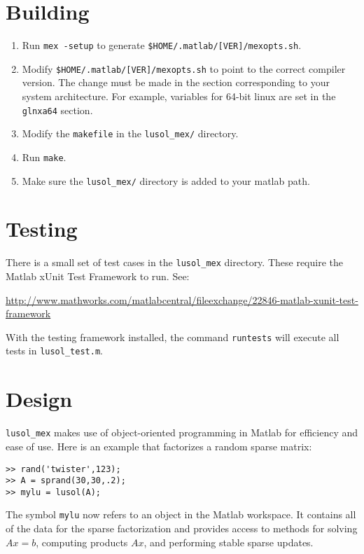 \documentclass[11pt]{article}
\newcommand{\lmex}{\texttt{lusol\_mex}\xspace}
\begin{document}
\section{Building}

\begin{enumerate}
\item Run \texttt{mex -setup} to generate
  \texttt{\$HOME/.matlab/[VER]/mexopts.sh}.
\item Modify \texttt{\$HOME/.matlab/[VER]/mexopts.sh} to point to the correct
  compiler version.  The change must be made in the section corresponding to
  your system architecture.  For example, variables for 64-bit linux are set in
  the \texttt{glnxa64} section.
\item Modify the \texttt{makefile} in the \texttt{lusol\_mex/} directory.
\item Run \texttt{make}.
\item Make sure the \texttt{lusol\_mex/} directory is added to your matlab
  path.
\end{enumerate}

\section{Testing}

There is a small set of test cases in the \lmex directory.  These require the
Matlab xUnit Test Framework to run.  See:

\begin{center}
\url{http://www.mathworks.com/matlabcentral/fileexchange/22846-matlab-xunit-test-framework}
\end{center}

With the testing framework installed, the command \texttt{runtests} will
execute all tests in \texttt{lusol\_test.m}.

\section{Design}

\lmex makes use of object-oriented programming in Matlab for efficiency and
ease of use.  Here is an example that factorizes a random sparse matrix:

\begin{verbatim}
>> rand('twister',123);
>> A = sprand(30,30,.2);
>> mylu = lusol(A);
\end{verbatim}

The symbol \texttt{mylu} now refers to an object in the Matlab workspace.  It
contains all of the data for the sparse factorization and provides access to
methods for solving $Ax=b$, computing products $Ax$, and performing stable
sparse updates.
\end{document}
